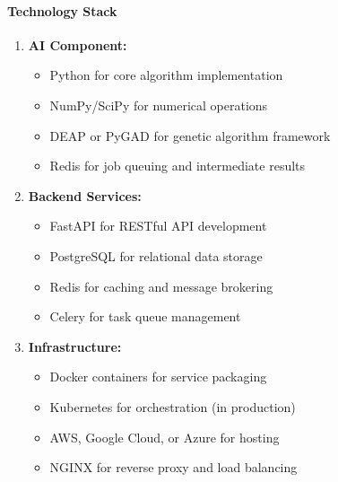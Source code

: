 \paragraph{Technology Stack}
\begin{enumerate}[label=\arabic*., nosep,leftmargin=*,topsep=2pt, partopsep=0pt, itemsep=1pt]
    \item \textbf{AI Component:}
        \begin{itemize}[label=\textendash, nosep,leftmargin=*,topsep=1pt, partopsep=0pt, itemsep=0pt]
            \item Python for core algorithm implementation
            \item NumPy/SciPy for numerical operations
            \item DEAP or PyGAD for genetic algorithm framework
            \item Redis for job queuing and intermediate results
        \end{itemize}
    \item \textbf{Backend Services:}
        \begin{itemize}[label=\textendash, nosep,leftmargin=*,topsep=1pt, partopsep=0pt, itemsep=0pt]
            \item FastAPI for RESTful API development
            \item PostgreSQL for relational data storage
            \item Redis for caching and message brokering
            \item Celery for task queue management
        \end{itemize}
    \item \textbf{Infrastructure:}
        \begin{itemize}[label=\textendash, nosep,leftmargin=*,topsep=1pt, partopsep=0pt, itemsep=0pt]
            \item Docker containers for service packaging
            \item Kubernetes for orchestration (in production)
            \item AWS, Google Cloud, or Azure for hosting
            \item NGINX for reverse proxy and load balancing
        \end{itemize}
\end{enumerate}


